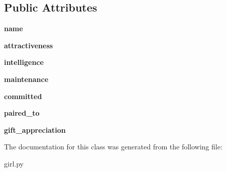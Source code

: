\subsection*{Public Attributes}
\begin{DoxyCompactItemize}
\item 
\mbox{\label{classgirl_1_1_girl_a386b062daa827ac3f0953c177f8d83b1}} 
{\bfseries name}
\item 
\mbox{\label{classgirl_1_1_girl_a1e45710de47cf736c2b32ca138170ef9}} 
{\bfseries attractiveness}
\item 
\mbox{\label{classgirl_1_1_girl_a73e791ac409ed6348ac1a38d3b05ffb9}} 
{\bfseries intelligence}
\item 
\mbox{\label{classgirl_1_1_girl_a41ec2fcdb3bf05596eb6e3b1d5afd99e}} 
{\bfseries maintenance}
\item 
\mbox{\label{classgirl_1_1_girl_a783a82506addbec453b57e0071461b74}} 
{\bfseries committed}
\item 
\mbox{\label{classgirl_1_1_girl_a36db43986e72d10910d1dc0311d88656}} 
{\bfseries paired\+\_\+to}
\item 
\mbox{\label{classgirl_1_1_girl_a1b633dcc662a2f6cd9f814881a1fb2a8}} 
{\bfseries gift\+\_\+appreciation}
\end{DoxyCompactItemize}


The documentation for this class was generated from the following file\+:\begin{DoxyCompactItemize}
\item 
girl.\+py\end{DoxyCompactItemize}
